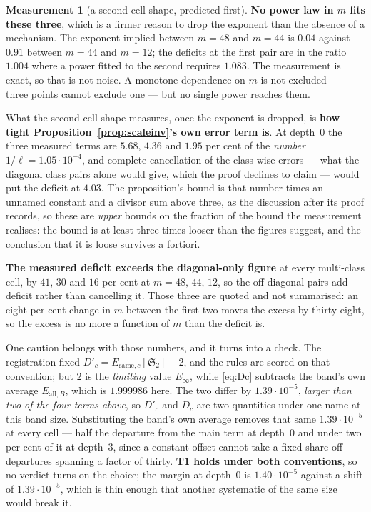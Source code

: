 \documentclass[11pt,a4paper]{article}
\theoremstyle{plain}
\theoremstyle{definition}
\newtheorem{measurement}[theorem]{Measurement}
\theoremstyle{remark}
\renewcommand{\SS}{\mathfrak{S}}
\begin{document}
\begin{measurement}[a second cell shape, predicted first]
\textbf{No power law in $m$ fits these three}, which is a firmer
reason to drop the exponent than the absence of a mechanism. The
exponent implied between $m=48$ and $m=44$ is $0.04$ against $0.91$
between $m=44$ and $m=12$; the deficits at the first pair are in the
ratio $1.004$ where a power fitted to the second requires $1.083$. The
measurement is exact, so that is not noise. A monotone dependence on
$m$ is not excluded --- three points cannot exclude one --- but no
single power reaches them.

What the second cell shape measures, once the exponent is dropped, is
\textbf{how tight Proposition~\ref{prop:scaleinv}'s own error term is}.
At depth~$0$ the three measured terms are $5.68$, $4.36$ and $1.95$ per
cent of the \emph{number} $1/\ell=1.05\cdot10^{-4}$, and complete
cancellation of the class-wise errors --- what the diagonal class pairs
alone would give, which the proof declines to claim --- would put the
deficit at $4.03$. The proposition's bound is that number times an
unnamed constant and a divisor sum above three, as the discussion after
its proof records, so these are \emph{upper} bounds on the fraction of
the bound the measurement realises: the bound is at least three times
looser than the figures suggest, and the conclusion that it is loose
survives a fortiori.

\textbf{The measured deficit exceeds the diagonal-only figure} at every
multi-class cell, by $41$, $30$ and $16$ per cent at $m=48,\,44,\,12$,
so the off-diagonal pairs add deficit rather than cancelling it. Those
three are quoted and not summarised: an eight per cent change in $m$
between the first two moves the excess by thirty-eight, so the excess
is no more a function of $m$ than the deficit is.

One caution belongs with those numbers, and it turns into a check. The
registration fixed $D'_c=E_{\mathrm{same},c}[\SS_2]-2$, and the rules
are scored on that convention; but $2$ is the \emph{limiting} value
$E_\infty$, while \eqref{eq:Dc} subtracts the band's own average
$E_{\mathrm{all},B}$, which is $1.999986$ here. The two differ by
$1.39\cdot10^{-5}$, \emph{larger than two of the four terms above}, so
$D'_c$ and $D_c$ are two quantities under one name at this band size.
Substituting the band's own average removes that same
$1.39\cdot10^{-5}$ at every cell --- half the departure from the main
term at depth~$0$ and under two per cent of it at depth~$3$, since a
constant offset cannot take a fixed share off departures spanning a
factor of thirty. \textbf{T1 holds under both conventions}, so no
verdict turns on the choice; the margin at depth~$0$ is
$1.40\cdot10^{-5}$ against a shift of $1.39\cdot10^{-5}$, which is thin
enough that another systematic of the same size would break it.


\end{measurement}
\end{document}
